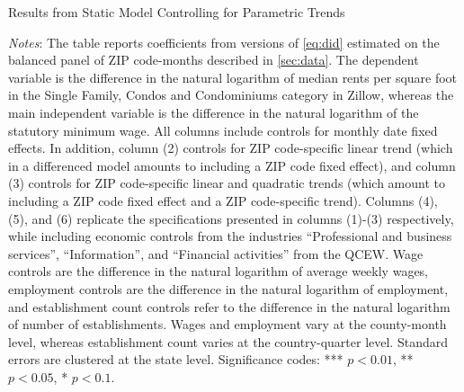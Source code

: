\clearpage
\begin{table}[h!]
	\caption{Results from Static Model Controlling for Parametric Trends}
	\label{tab:did_trend}
	\centering
	\resizebox{\textwidth}{!}{
	
	}
	\begin{minipage}{0.95\textwidth} \footnotesize
		\vspace{3mm} 
		\textit{Notes}: The table reports coefficients from versions of \autoref{eq:did} 
		estimated on the balanced panel of ZIP code-months described in \autoref{sec:data}. 
		The dependent variable is the difference in the natural logarithm of median	rents 
		per	square foot in the Single Family, Condos and Condominiums category in Zillow, 
		whereas the main independent variable is the difference in the natural logarithm
		of the statutory minimum wage. All columns include controls for monthly date fixed 
		effects. In addition, column (2) controls for ZIP code-specific linear trend (which 
		in a differenced model amounts to including a ZIP code fixed effect), and column (3) 
		controls for ZIP code-specific linear and quadratic trends (which amount to including 
		a ZIP code fixed effect and a ZIP code-specific trend). Columns (4), (5), and (6) replicate
		the specifications presented in columns (1)-(3) respectively, while including 
		economic controls from the industries ``Professional and business services'', 
		``Information'', and ``Financial activities'' from the QCEW. Wage controls are 
		the difference in the natural logarithm of average weekly wages, employment 
		controls are the difference in the natural logarithm of employment, and 
		establishment count controls refer to the difference in the natural logarithm 
		of number of establishments. Wages and employment vary at the county-month level,
		whereas establishment count varies at the country-quarter level.
		Standard errors are clustered 
		at the state level. Significance codes: *** $p < 0.01$, ** $p < 0.05$, * $p < 0.1$.
	\end{minipage}
\end{table}

